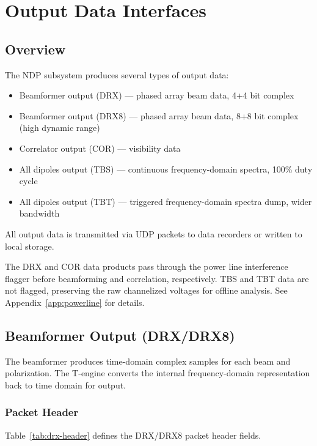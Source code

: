 
\chapter{Output Data Interfaces}
\label{sec:output}

\section{Overview}

The NDP subsystem produces several types of output data:
\begin{itemize}
    \item Beamformer output (DRX) --- phased array beam data, 4+4 bit complex
    \item Beamformer output (DRX8) --- phased array beam data, 8+8 bit complex (high dynamic range)
    \item Correlator output (COR) --- visibility data
    \item All dipoles output (TBS) --- continuous frequency-domain spectra, 100\% duty cycle
    \item All dipoles output (TBT) --- triggered frequency-domain spectra dump, wider bandwidth
\end{itemize}

All output data is transmitted via UDP packets to data recorders or written to local storage.

The DRX and COR data products pass through the power line interference flagger before beamforming and correlation, respectively. TBS and TBT data are not flagged, preserving the raw channelized voltages for offline analysis. See Appendix~\ref{app:powerline} for details.

\section{Beamformer Output (DRX/DRX8)}

The beamformer produces time-domain complex samples for each beam and polarization. The T-engine converts the internal frequency-domain representation back to time domain for output.

\subsection{Packet Header}

Table~\ref{tab:drx-header} defines the DRX/DRX8 packet header fields.

